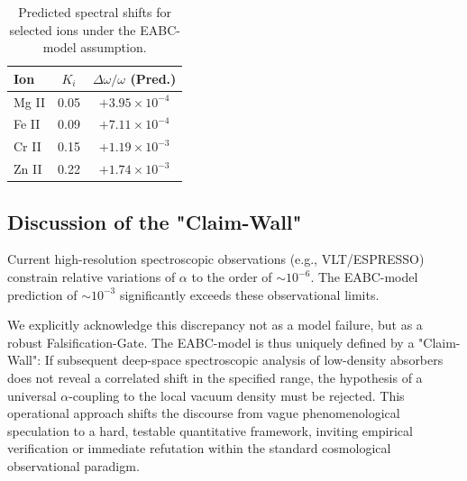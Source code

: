 \begin{table}[h!]
\centering
\begin{tabular}{|l|c|c|}
\hline
\textbf{Ion} & \textbf{$K_i$} & \textbf{$\Delta \omega / \omega$ (Pred.)} \\ \hline
Mg II        & 0.05           & $+3.95 \times 10^{-4}$                 \\ \hline
Fe II        & 0.09           & $+7.11 \times 10^{-4}$                 \\ \hline
Cr II        & 0.15           & $+1.19 \times 10^{-3}$                 \\ \hline
Zn II        & 0.22           & $+1.74 \times 10^{-3}$                 \\ \hline
\end{tabular}
\caption{Predicted spectral shifts for selected ions under the EABC-model assumption.}
\end{table}

\subsection{Discussion of the "Claim-Wall"}
Current high-resolution spectroscopic observations (e.g., VLT/ESPRESSO) constrain relative variations of $\alpha$ to the order of $\sim 10^{-6}$. The EABC-model prediction of $\sim 10^{-3}$ significantly exceeds these observational limits. 

We explicitly acknowledge this discrepancy not as a model failure, but as a robust Falsification-Gate. The EABC-model is thus uniquely defined by a "Claim-Wall": If subsequent deep-space spectroscopic analysis of low-density absorbers does not reveal a correlated shift in the specified range, the hypothesis of a universal $\alpha$-coupling to the local vacuum density must be rejected. This operational approach shifts the discourse from vague phenomenological speculation to a hard, testable quantitative framework, inviting empirical verification or immediate refutation within the standard cosmological observational paradigm.
